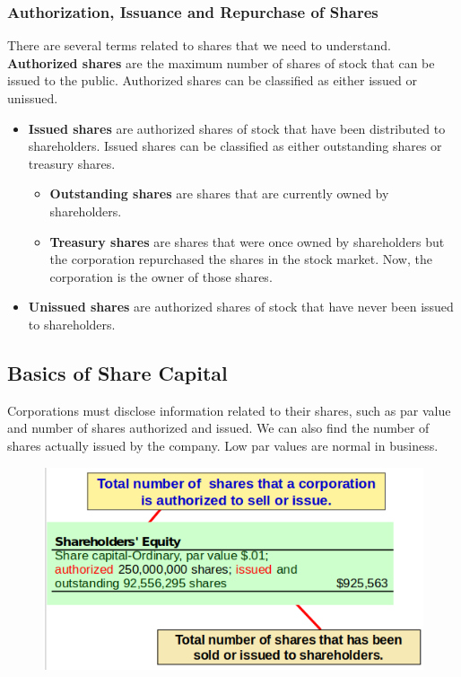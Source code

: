 \documentclass[../main.tex]{subfiles}
\begin{document}
	\subsubsection{Authorization, Issuance and Repurchase of Shares}
	
	There are several terms related to shares that we need to understand. 
	\textbf{Authorized shares} are the maximum number of shares of stock that 
	can be issued to the public. Authorized shares can be classified as either 
	issued or unissued. 
	\begin{itemize}[noitemsep]
	\item \textbf{Issued shares} are authorized shares of stock 
	that have been distributed to shareholders. Issued shares can be classified 
	as either outstanding shares or treasury shares. 
	\begin{itemize}[noitemsep]
		\item \textbf{Outstanding shares} are shares that are currently owned 
		by shareholders.  
		\item \textbf{Treasury shares} are shares that were once owned by 
		shareholders but the corporation repurchased the shares in the stock 
		market. Now, the corporation is the owner of those shares.
	\end{itemize}
	\item \textbf{Unissued shares} are authorized shares of stock that have 
	never been issued to shareholders.
	\end{itemize}

	\subsection{Basics of Share Capital}
	
	Corporations must disclose information related to their shares, such as par 
	value and number of shares authorized and issued.  We can also find the 
	number of shares actually issued by the company. Low par values are normal 
	in business.
	
	\begin{figure}[ht]
		\centering
		\includegraphics[width=\columnwidth]{images/c9/basics_share.png}
	\end{figure}
	
\end{document}
